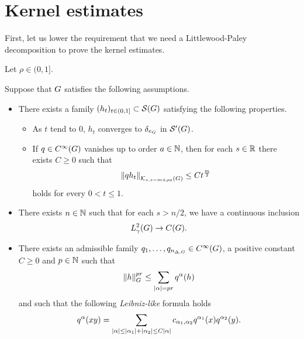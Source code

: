 \section{Kernel estimates}

First,
let us lower the requirement that we need a Littlewood-Paley decomposition
to prove the kernel estimates.

\begin{theorem}
    Let $\rho \in (0, 1]$.

    Suppose that $\Group$ satisfies the following assumptions.
    \begin{itemize}
        \item
            There exists a family $(h_t)_{t \in (0, 1]} \subset \Schwartz \Group$
            satisfying the following properties.
            \begin{itemize}
                \item As $t$ tend to $0$, $h_t$ converges to $\delta_{e_\Group}$ in $\TemperedDistributions \Group$.
                \item If $q \in \SmoothFunctions {\Group}$ vanishes up to order $a \in \N$,
                    then for each $s \in \R$ there exists $C \geq 0$ such that
                    \begin{align}
                        \norm [\KernelsSobolev s {s - m + \rho a}] {q h_t}
                        \leq C t^{\frac m 2}
                        \label{eq:kernel_estimates:heat_kernel_condition}
                    \end{align}
                    holds for every $0 < t \leq 1$.
            \end{itemize}
        \item There exists $n \in \N$ such that for each $s > n/2$,
            we have a continuous inclusion
            \begin{align*}
                \Sobolev \gamma \to \ContinuousFunctions \Group.
            \end{align*}
        \item There exists an admissible family $q_1, \dots, q_{\dimDifferenceOperators} \in \SmoothFunctions \Group$, a positive constant $C \geq 0$ and $p \in \N$ such that
            \begin{align*}
                \norm [\Group] h^{p r} \leq \sum_{\abs \alpha = pr} q^\alpha(h)
            \end{align*}
            and such that the following \emph{Leibniz-like} formula holds
            \begin{align*}
                q^\alpha(x y) = \sum_{\abs \alpha \leq \abs {\alpha_1} + \abs {\alpha_2} \leq C \abs \alpha}
                c_{\alpha_1, \alpha_2} q^{\alpha_1}(x) q^{\alpha_2}(y).
            \end{align*}
    \end{itemize}


\end{theorem}
